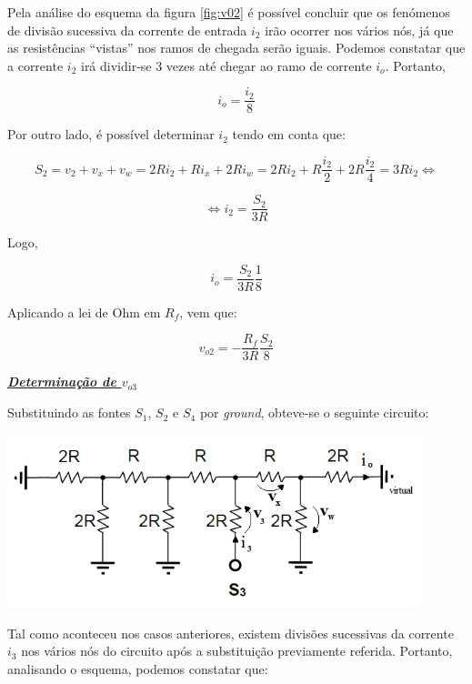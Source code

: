 \documentclass[a4paper,11pt]{report}
\begin{document}
     
Pela análise do esquema da figura \ref{fig:v02} é possível concluir que os fenómenos de divisão sucessiva da corrente de entrada $i_2$ irão ocorrer nos vários nós, já que as resistências ``vistas'' nos ramos de chegada serão iguais.
Podemos constatar que a corrente $i_2$ irá dividir-se 3 vezes até chegar ao ramo de corrente $i_o$. Portanto,

$$i_o=\frac{i_2}{8}$$

Por outro lado, é possível determinar $i_2$ tendo em conta que:

$$S_2=v_2+v_x+v_w=2Ri_2+Ri_x+2Ri_w=2Ri_2+R\frac{i_2}{2}+2R\frac{i_2}{4}=3Ri_2\Leftrightarrow$$

$$\Leftrightarrow i_2=\frac{S_2}{3R}$$

Logo, 

$$i_o=\frac{S_2}{3R}\frac{1}{8}$$


Aplicando a lei de Ohm em $R_f$, vem que:

\begin{equation}\label{eq:v02}
v_{o2}=-\frac{R_f}{3R}\frac{S_2}{8}
\end{equation}


\large\underline{{\textit{\textbf{Determinação de $v_{o3}$}}}}\\
\par

Substituindo as fontes $S_1$, $S_2$ e $S_4$ por \textit{ground}, obteve-se o seguinte circuito:


\begin{center}
     \includegraphics[angle=0,width=0.9\textwidth]{v03.png}
     \label{fig:v03}
     \end{center}

Tal como aconteceu nos casos anteriores, existem divisões sucessivas da corrente $i_3$ nos vários nós do circuito após a substituição previamente referida. Portanto, analisando o esquema, podemos constatar que:
\end{document}
